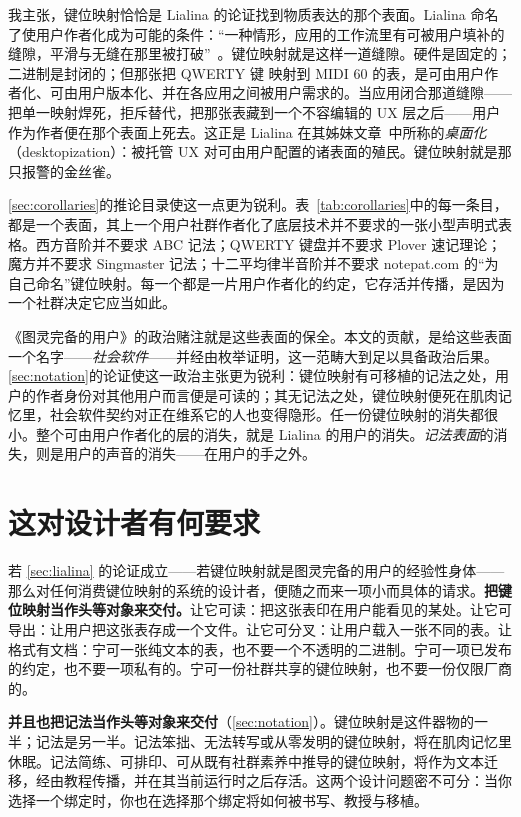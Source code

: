\documentclass[10pt,letterpaper,twocolumn]{article}
\DeclareRobustCommand{\key}[1]{\tikz[baseline=(k.base)]{%
 \node[fill=keystroke, rounded corners=1.3pt, inner xsep=2.4pt,
    inner ysep=1.9pt, anchor=base, yshift=-1.2pt] at (0,0)
  {\footnotesize\ttfamily\bfseries\vphantom{A}\phantom{#1}};
 \node[draw=keystroke, line width=0.4pt, fill=keyfill,
    rounded corners=1.3pt, inner xsep=2.4pt, inner ysep=1.9pt,
    anchor=base] (k) at (0,0)
  {\footnotesize\ttfamily\bfseries\vphantom{A}#1};}}
\begin{document}
我主张，键位映射恰恰是 Lialina 的论证找到物质表达的那个表面。Lialina 命名了使用户作者化成为可能的条件：“一种情形，应用的工作流里有可被用户填补的缝隙，平滑与无缝在那里被打破”~\citep{lialina2012turing}。键位映射就是这样一道缝隙。硬件是固定的；二进制是封闭的；但那张把 QWERTY 键 \key{A} 映射到 MIDI 60 的表，是可由用户作者化、可由用户版本化、并在各应用之间被用户需求的。当应用闭合那道缝隙——把单一映射焊死，拒斥替代，把那张表藏到一个不容编辑的 UX 层之后——用户作为作者便在那个表面上死去。这正是 Lialina 在其姊妹文章~\citep{lialina2018rich}中所称的\emph{桌面化}（desktopization）：被托管 UX 对可由用户配置的诸表面的殖民。键位映射就是那只报警的金丝雀。

\textsection\ref{sec:corollaries}的推论目录使这一点更为锐利。表~\ref{tab:corollaries}中的每一条目，都是一个表面，其上一个用户社群作者化了底层技术并不要求的一张小型声明式表格。西方音阶并不要求 ABC 记法；QWERTY 键盘并不要求 Plover 速记理论；魔方并不要求 Singmaster 记法；十二平均律半音阶并不要求 notepat.com 的“为自己命名”键位映射。每一个都是一片用户作者化的约定，它存活并传播，是因为一个社群决定它应当如此。

《图灵完备的用户》的政治赌注就是这些表面的保全。本文的贡献，是给这些表面一个名字——\emph{社会软件}——并经由枚举证明，这一范畴大到足以具备政治后果。\textsection\ref{sec:notation}的论证使这一政治主张更为锐利：键位映射有可移植的记法之处，用户的作者身份对其他用户而言便是可读的；其无记法之处，键位映射便死在肌肉记忆里，社会软件契约对正在维系它的人也变得隐形。任一份键位映射的消失都很小。整个可由用户作者化的层的消失，就是 Lialina 的用户的消失。\emph{记法表面}的消失，则是用户的声音的消失——在用户的手之外。

\section{这对设计者有何要求}
\label{sec:design}

若 \textsection\ref{sec:lialina} 的论证成立——若键位映射就是图灵完备的用户的经验性身体——那么对任何消费键位映射的系统的设计者，便随之而来一项小而具体的请求。\textbf{把键位映射当作头等对象来交付。}让它可读：把这张表印在用户能看见的某处。让它可导出：让用户把这张表存成一个文件。让它可分叉：让用户载入一张不同的表。让格式有文档：宁可一张纯文本的表，也不要一个不透明的二进制。宁可一项已发布的约定，也不要一项私有的。宁可一份社群共享的键位映射，也不要一份仅限厂商的。

\textbf{并且也把记法当作头等对象来交付}（\textsection\ref{sec:notation}）。键位映射是这件器物的一半；记法是另一半。记法笨拙、无法转写或从零发明的键位映射，将在肌肉记忆里休眠。记法简练、可排印、可从既有社群素养中推导的键位映射，将作为文本迁移，经由教程传播，并在其当前运行时之后存活。这两个设计问题密不可分：当你选择一个绑定时，你也在选择那个绑定将如何被书写、教授与移植。
\end{document}
